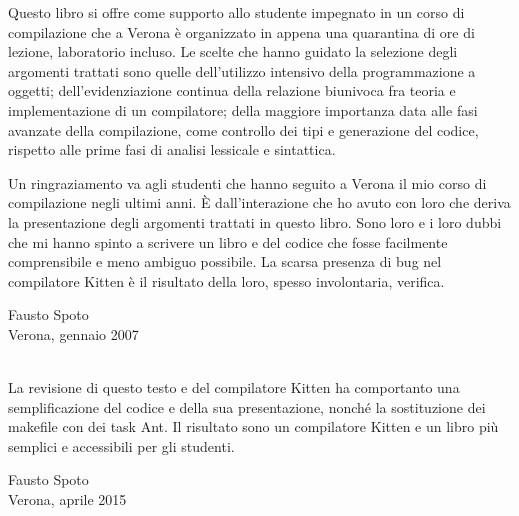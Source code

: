 Questo libro si offre come supporto allo studente impegnato in un corso
di compilazione che a Verona \`e organizzato in appena
una quarantina di ore
di lezione, laboratorio incluso. Le scelte
che hanno guidato la selezione degli argomenti trattati sono quelle
dell'utilizzo intensivo della programmazione a oggetti; dell'evidenziazione
continua della relazione biunivoca fra teoria e implementazione di
un compilatore; della maggiore
importanza data alle fasi avanzate della compilazione,
come controllo dei tipi e generazione del codice,
rispetto alle prime fasi di analisi lessicale e sintattica.

Un ringraziamento va agli studenti che hanno seguito a Verona
il mio corso di compilazione negli ultimi anni. \`E dall'interazione
che ho avuto con loro che deriva la presentazione degli argomenti trattati
in questo libro. Sono loro e i loro dubbi che mi hanno spinto a
scrivere un libro e del codice che fosse
facilmente comprensibile e meno ambiguo possibile.
La scarsa presenza di bug nel compilatore Kitten \`e il risultato
della loro, spesso involontaria, verifica.

{\flushright Fausto Spoto\\\hfill Verona, gennaio 2007}

\mbox{}\\

La revisione di questo testo e del compilatore Kitten ha comportanto una
semplificazione del codice e della sua presentazione, nonch\'e
la sostituzione dei makefile con dei task Ant. Il risultato sono
un compilatore Kitten e un libro pi\`u semplici e accessibili per
gli studenti.

{\flushright Fausto Spoto\\\hfill Verona, aprile 2015}


\newpage
\tableofcontents
\cleardoublepage

 \setcounter{page}{1}


